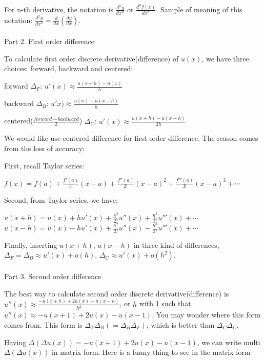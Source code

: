 \documentclass{article}
\newenvironment{nscenter}
{\parskip=0pt\par\nopagebreak\centering}
{\par\noindent\ignorespacesafterend}
\begin{document}
\begin{spacing}{1.5}
For n-th derivative, the notation is $\frac{d^ny}{dx^n}$ or $\frac{d^nf(x)}{dx^n}$. Sample of meaning of this notation: $\frac{d^2y}{dx^2}=\frac{d}{dx}(\frac{dy}{dx})$.
\\\\Part 2. First order difference

To calculate first order discrete derivative(difference) of $u(x)$, we have three choices: forward, backward and centered:

\hspace*{2cm}forward $\Delta_F$: $u'(x)\approx \frac{u(x+h)-u(x)}{h}$

\hspace*{2cm}backward $\Delta_B$: $u'x)\approx \frac{u(x)-u(x-h)}{h}$

\hspace*{2cm}centered($\frac{forward - backward}{2}$) $\Delta_C$: $u'(x)\approx \frac{u(x+h)-u(x-h)}{2h}$ 

We would like use centered difference for first order difference. The reason comes from the loss of accuracy:

First, recall Taylor series:
\begin{nscenter}
$f(x) = f(a)+{\frac {f'(a)}{1!}}(x-a)+{\frac {f''(a)}{2!}}(x-a)^{2}+{\frac {f'''(a)}{3!}}(x-a)^{3}+\cdots$
\end{nscenter}

Second, from Taylor series, we have:
\begin{nscenter}
$u(x+h)=u(x)+hu'(x) + \frac{h^2}{2!}u''(x) + \frac{h^3}{3!}u'''(x) + \cdots$
$u(x-h)=u(x)-hu'(x) + \frac{h^2}{2!}u''(x) - \frac{h^3}{3!}u'''(x) + \cdots$
\end{nscenter}

Finally, inserting $u(x+h)$, $u(x-h)$ in three kind of differences, $\Delta_F = \Delta_B \approx u'(x) + o(h)$, $\Delta_C\approx u'(x) + o(h^2)$.
\\\\Part 3. Second order difference

The best way to calculate second order discrete derivative(difference) is $u''(x) \approx \frac{-u(x+h) + 2u(x) -u(x-h)}{h^2}$, or $h$ with 1 such that $u''(x) \approx -u(x+1) + 2u(x)-u(x-1)$. You may wonder where this form comes from. This form is $\Delta_F\Delta_B(=\Delta_B\Delta_F)$, which is better than $\Delta_C \Delta_C$.

Having $\Delta(\Delta u(x)) = -u(x+1) + 2u(x)-u(x-1)$, we can write multi $\Delta(\Delta u(x))$ in matrix form. Here is a funny thing to see in the matrix form


\end{spacing}
\end{document}
